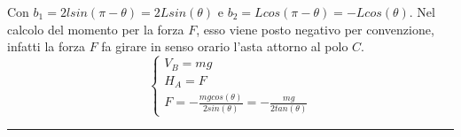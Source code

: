 Con $b_1 = 2l sin (\pi - \theta) = 2 L sin( \theta)$ e $b_2 = L cos(\pi - \theta) = -L cos(\theta)$.\newline
Nel calcolo del momento per la forza $F$, esso viene posto negativo per convenzione, infatti la forza $F$ fa girare in senso orario l'asta attorno al polo $C$.
\[
    \begin{cases}
        V_B = mg\\
        H_A = F\\
        F = - \frac{mg cos(\theta)}{2 sin(\theta)} = - \frac{mg}{2 tan(\theta)}
    \end{cases}
\]
\rule{\textwidth}{0,4pt}